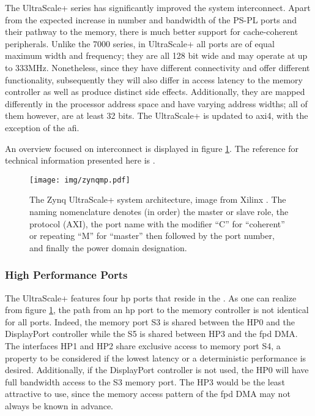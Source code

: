 The UltraScale+ series has significantly improved the system interconnect.
Apart from the expected increase in number and bandwidth of the
PS-PL ports and their pathway to the memory, there is much better support
for cache-coherent peripherals.
Unlike the 7000 series, in UltraScale+
all ports are of equal maximum width and frequency;
they are all 128 bit wide and may operate at up to 333MHz.
Nonetheless, since they have different connectivity and offer different
functionality, subsequently they will also differ in access latency to
the memory controller as well as produce distinct side effects.
Additionally, they are mapped differently in the
processor address space and have varying address widths; all of them
however, are at least 32 bits.
The UltraScale+ is updated to \gls{axi}4, with the exception of the \gls{afi}.

An overview focused on interconnect
is displayed in figure \ref{fig:zynqmp-interconnect}.
The reference for technical information presented here is \cite{ug1085}.

\begin{figure}[htbp]
  \centering
  \texttt{[image: img/zynqmp.pdf]}
  \caption{The Zynq UltraScale+ system architecture, image from Xilinx \cite{ug1085}.
  The naming nomenclature denotes (in order) the master or slave role,
  the protocol (AXI), the port name with the modifier ``C'' for ``coherent'' or
  repeating ``M'' for ``master'' then followed by the port number, and finally
  the power domain designation.
  }
  \label{fig:zynqmp-interconnect}
\end{figure}


\subsubsection{High Performance Ports}
\label{sect:implementation}

The UltraScale+ features four \gls{hp} ports that reside in the .
As one can realize from figure \ref{fig:zynqmp-interconnect},
the path from an \gls{hp} port to the memory controller is not identical for all ports.
Indeed, the memory port S3 is shared between the HP0 and the DisplayPort controller
while the S5 is shared between HP3 and the \gls{fpd} DMA.
The interfaces HP1 and HP2 share exclusive access to memory port S4,
a property to be considered if the lowest latency
or a deterministic performance is desired. Additionally, if the DisplayPort
controller is not used, the HP0 will have full bandwidth access to the S3 memory port.
The HP3 would be the least attractive to use,
since the memory access pattern of the \gls{fpd}
DMA may not always be known in advance.

